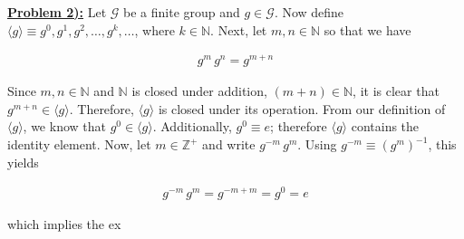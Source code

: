 \documentclass{article}[12]
\numberwithin{equation}{section}
\newcommand{\numbpr}[1]{\setcounter{section}{#1} \setcounter{equation}{0}}
\newcommand{\prob}[1]{\textbf{\underline{Problem #1):}}}
\newcommand{\N}{\mathbb{N}}
\newcommand{\Z}{\mathbb{Z}}
\begin{document}
\begin{flushleft}
\vspace{0.25 in}



\numbpr{2}
\prob{2} Let $\mathcal{G}$ be a finite group and $g \in \mathcal{G}$.  Now define $\langle g \rangle \equiv g^0, g^1, g^2, \dots, g^k, \dots$, where $k \in \N$.  Next, let $m, n \in \N$ so that we have

\begin{align*}
  g^m \, g^n = g^{m + n}
\end{align*}

Since $m, n \in \N$ and $\N$ is closed under addition, $\left( m + n \right) \in \N$, it is clear that $g^{m + n} \in \langle g \rangle$.  Therefore, $\langle g \rangle$ is closed under its operation.  From our definition of $\langle g \rangle$, we know that $g^0 \in \langle g \rangle$.  Additionally, $g^0 \equiv e$; therefore $\langle g \rangle$ contains the identity element.  Now, let $m \in \Z^+$ and write $g^{-m} \, g^m$.  Using $g^{-m} \equiv \left( g^m \right)^{-1}$, this yields

\begin{align*}
  g^{-m} \, g^m = g^{-m + m} = g^0 = e
\end{align*}

which implies the ex

















































\end{flushleft}
\end{document}
